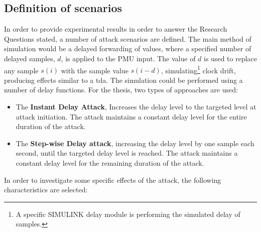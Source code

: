 



\subsection{Definition of scenarios}
In order to provide experimental results in order to answer the Research Questions stated, a number of attack scenarios are defined.
The main method of simulation would be a delayed forwarding of values, where a specified number of delayed samples, $d$, is applied to the PMU input. The value of $d$ is used to replace any sample $s(i)$ with the sample value $s(i-d)$, simulating\footnote{A specific SIMULINK delay module is performing the simulated delay of samples.} clock drift, producing effects similar to a \acrlong{tda}.
The simulation could be performed using a number of delay functions. For the thesis, two types of approaches are used:
\begin{itemize}
    \item The \textbf{Instant Delay Attack}, Increases the delay level to the targeted level at attack initiation. The attack maintains a constant delay level for the entire duration of the attack. 
    \item The \textbf{Step-wise Delay attack}, increasing the delay level by one sample each second, until the targeted delay level is reached. The attack maintains a constant delay level for the remaining duration of the attack.
\end{itemize}


In order to investigate some specific effects of the attack, the following characteristics are selected:



